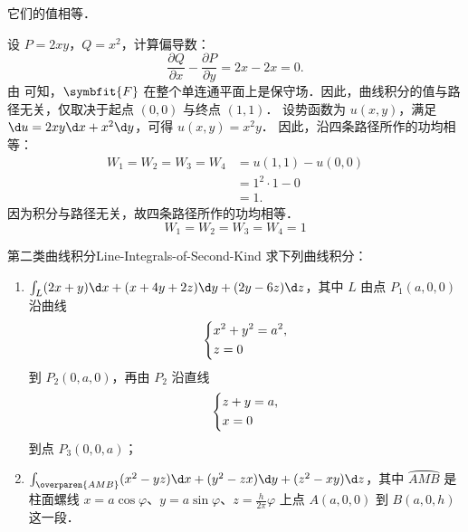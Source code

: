 \begin{solution}
     它们的值相等．

    设 $P = 2xy$，$Q = x^2$，计算偏导数：
    \begin{equation}
        \label{eq:curl-2}
        \frac{\partial Q}{\partial x} - \frac{\partial P}{\partial y} = 2x - 2x = 0.
    \end{equation}
    由  可知，$\symbfit{F}$ 在整个单连通平面上是保守场．因此，曲线积分的值与路径无关，仅取决于起点 $(0,0)$ 与终点 $(1,1)$．
    设势函数为 $u(x,y)$，满足 $\d u = 2xy \d x + x^2 \d y$，可得 $u(x,y) = x^2 y$．
    因此，沿四条路径所作的功均相等：
    \begin{equation}
        \begin{aligned}
            W_1 = W_2 = W_3 = W_4 & = u(1,1) - u(0,0) \\
                                  & = 1^2 \cdot 1 - 0 \\
                                  & = 1.
        \end{aligned}
    \end{equation}
    因为积分与路径无关，故四条路径所作的功均相等．
    \begin{equation}
        \boxed{W_1 = W_2 = W_3 = W_4 = 1}
    \end{equation}
\end{solution}

\begin{problem}{第二类曲线积分}{Line-Integrals-of-Second-Kind}
    求下列曲线积分：
    \begin{enumerate}
        \item $\int_{L} (2x+y) \d x + (x+4y+2z) \d y + (2y-6z) \d z$，其中 $L$ 由点 $P_1(a,0,0)$ 沿曲线
              \begin{equation}
                  \begin{dcases}
                      x^2 + y^2 = a^2, \\
                      z = 0
                  \end{dcases}
              \end{equation}
              到 $P_2(0,a,0)$，再由 $P_2$ 沿直线
              \begin{equation}
                  \begin{dcases}
                      z + y = a, \\
                      x = 0
                  \end{dcases}
              \end{equation}
              到点 $P_3(0,0,a)$；
        \item $\int_{\overparen{AMB}} (x^2 - yz) \d x + (y^2 - zx) \d y + (z^2 - xy) \d z$，其中 $\overparen{AMB}$ 是柱面螺线 $x = a \cos \varphi$、$y = a \sin \varphi$、$z = \frac{h}{2\pi} \varphi$ 上点 $A(a,0,0)$ 到 $B(a,0,h)$ 这一段．
    \end{enumerate}
\end{problem}

